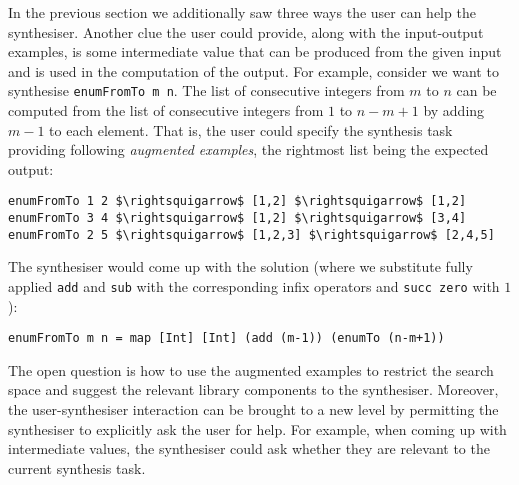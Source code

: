 In the previous section we additionally saw three ways the user can help the synthesiser. Another clue the user could provide, along with the input-output examples, is some intermediate value that can be produced from the given input and is used in the computation of the output.
For example, consider we want to synthesise \lstinline!enumFromTo m n!. The list of consecutive integers from $m$ to $n$ can be computed from the list of consecutive integers from $1$ to $n-m+1$ by adding $m-1$ to each element. That is, the user could specify the synthesis task providing following \emph{augmented examples}, the rightmost list being the expected output:
\begin{lstlisting}[style=plain]
enumFromTo 1 2 $\rightsquigarrow$ [1,2] $\rightsquigarrow$ [1,2]
enumFromTo 3 4 $\rightsquigarrow$ [1,2] $\rightsquigarrow$ [3,4]
enumFromTo 2 5 $\rightsquigarrow$ [1,2,3] $\rightsquigarrow$ [2,4,5]
\end{lstlisting}
The synthesiser would come up with the solution (where we substitute fully applied \lstinline!add! and \lstinline!sub! with the corresponding infix operators and \lstinline!succ zero! with $1$):
\begin{lstlisting}[style=plain]
enumFromTo m n = map [Int] [Int] (add (m-1)) (enumTo (n-m+1))
\end{lstlisting}
The open question is how to use the augmented examples to restrict the search space and suggest the relevant library components to the synthesiser. 
Moreover, the user-synthesiser interaction can be brought to a new level by permitting the synthesiser to explicitly ask the user for help. For example, when coming up with intermediate values, the synthesiser could ask whether they are relevant to the current synthesis task.



